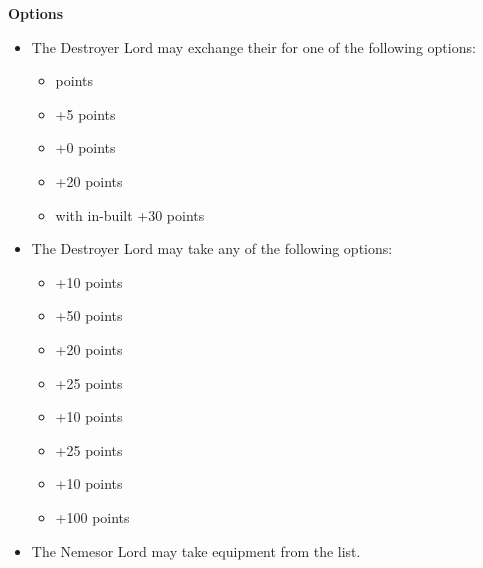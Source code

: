 \begin{minipage}[t]{0.72\textwidth}
	\vspace*{2em}
	\textbf{Options}
	\begin{itemize}
		\item The Destroyer Lord may exchange their  for one of the following options:
		\begin{itemize}			
			\item {}  points
			\item {} \dotfill +5 points
			\item {} \dotfill +0 points
			\item {} \dotfill +20 points
			\item {} with in-built  \dotfill +30 points
		\end{itemize}
		\item The Destroyer Lord may take any of the following options:
		\begin{itemize}
			\item {} \dotfill +10 points
			\item {} \dotfill +50 points
			\item {} \dotfill +20 points
			\item {} \dotfill +25 points
			\item {} \dotfill +10 points
			\item {} \dotfill +25 points
			\item {} \dotfill +10 points
			\item {} \dotfill +100 points
		\end{itemize}
		\item The Nemesor Lord may take equipment from the  list.
	\end{itemize}
\end{minipage}



\newpage
\subsubsection[Flayer King]{}

